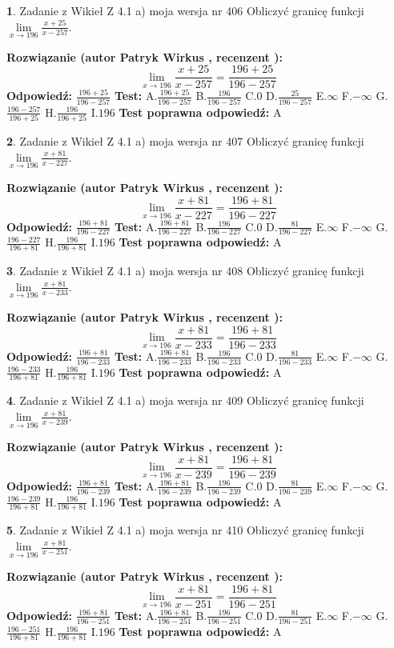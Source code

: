 \documentclass[12pt, a4paper]{article}
\theoremstyle{definition} %
\newtheorem{zad}{}
\newcommand{\zadStart}[1]{\begin{zad}#1\newline}
\newcommand{\zadStop}{\end{zad}}
\newcommand{\rozwStart}[2]{\noindent \textbf{Rozwiązanie (autor #1 , recenzent #2): }\newline}
\newcommand{\rozwStop}{\newline}
\newcommand{\odpStart}{\noindent \textbf{Odpowiedź:}\newline}
\newcommand{\odpStop}{\newline}
\newcommand{\testStart}{\noindent \textbf{Test:}\newline}
\newcommand{\testStop}{\newline}
\newcommand{\kluczStart}{\noindent \textbf{Test poprawna odpowiedź:}\newline}
\newcommand{\kluczStop}{\newline}
\begin{document}
\zadStart{Zadanie z Wikieł Z 4.1 a) moja wersja nr 406}
Obliczyć granicę funkcji $\lim\limits_{x\to196}\frac{x+25}{x-257}$.
\zadStop
\rozwStart{Patryk Wirkus}{}
$$\lim\limits_{x\to196}\frac{x+25}{x-257} = \frac{196+25}{196-257}$$
\rozwStop
\odpStart
$\frac{196+25}{196-257}$
\odpStop
\testStart
A.$\frac{196+25}{196-257}$
B.$\frac{196}{196-257}$
C.$0$
D.$\frac{25}{196-257}$
E.$\infty$
F.$-\infty$
G.$\frac{196-257}{196+25}$
H.$\frac{196}{196+25}$
I.$196$
\testStop
\kluczStart
A
\kluczStop



\zadStart{Zadanie z Wikieł Z 4.1 a) moja wersja nr 407}
Obliczyć granicę funkcji $\lim\limits_{x\to196}\frac{x+81}{x-227}$.
\zadStop
\rozwStart{Patryk Wirkus}{}
$$\lim\limits_{x\to196}\frac{x+81}{x-227} = \frac{196+81}{196-227}$$
\rozwStop
\odpStart
$\frac{196+81}{196-227}$
\odpStop
\testStart
A.$\frac{196+81}{196-227}$
B.$\frac{196}{196-227}$
C.$0$
D.$\frac{81}{196-227}$
E.$\infty$
F.$-\infty$
G.$\frac{196-227}{196+81}$
H.$\frac{196}{196+81}$
I.$196$
\testStop
\kluczStart
A
\kluczStop



\zadStart{Zadanie z Wikieł Z 4.1 a) moja wersja nr 408}
Obliczyć granicę funkcji $\lim\limits_{x\to196}\frac{x+81}{x-233}$.
\zadStop
\rozwStart{Patryk Wirkus}{}
$$\lim\limits_{x\to196}\frac{x+81}{x-233} = \frac{196+81}{196-233}$$
\rozwStop
\odpStart
$\frac{196+81}{196-233}$
\odpStop
\testStart
A.$\frac{196+81}{196-233}$
B.$\frac{196}{196-233}$
C.$0$
D.$\frac{81}{196-233}$
E.$\infty$
F.$-\infty$
G.$\frac{196-233}{196+81}$
H.$\frac{196}{196+81}$
I.$196$
\testStop
\kluczStart
A
\kluczStop



\zadStart{Zadanie z Wikieł Z 4.1 a) moja wersja nr 409}
Obliczyć granicę funkcji $\lim\limits_{x\to196}\frac{x+81}{x-239}$.
\zadStop
\rozwStart{Patryk Wirkus}{}
$$\lim\limits_{x\to196}\frac{x+81}{x-239} = \frac{196+81}{196-239}$$
\rozwStop
\odpStart
$\frac{196+81}{196-239}$
\odpStop
\testStart
A.$\frac{196+81}{196-239}$
B.$\frac{196}{196-239}$
C.$0$
D.$\frac{81}{196-239}$
E.$\infty$
F.$-\infty$
G.$\frac{196-239}{196+81}$
H.$\frac{196}{196+81}$
I.$196$
\testStop
\kluczStart
A
\kluczStop



\zadStart{Zadanie z Wikieł Z 4.1 a) moja wersja nr 410}
Obliczyć granicę funkcji $\lim\limits_{x\to196}\frac{x+81}{x-251}$.
\zadStop
\rozwStart{Patryk Wirkus}{}
$$\lim\limits_{x\to196}\frac{x+81}{x-251} = \frac{196+81}{196-251}$$
\rozwStop
\odpStart
$\frac{196+81}{196-251}$
\odpStop
\testStart
A.$\frac{196+81}{196-251}$
B.$\frac{196}{196-251}$
C.$0$
D.$\frac{81}{196-251}$
E.$\infty$
F.$-\infty$
G.$\frac{196-251}{196+81}$
H.$\frac{196}{196+81}$
I.$196$
\testStop
\kluczStart
A
\kluczStop
\end{document}
